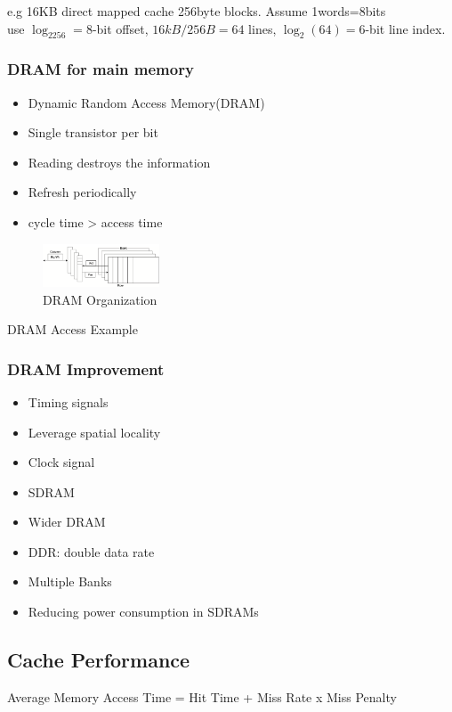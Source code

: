 e.g 16KB direct mapped cache 256byte blocks. Assume 1words=8bits\\
use $\log_2256=8$-bit offset, $16kB/256B=64$ lines, $\log_2(64)=6$-bit line index. 

\subsubsection{DRAM for main memory}
\begin{itemize}
    \item Dynamic Random Access Memory(DRAM)
    \item Single transistor per bit
    \item Reading destroys the information
    \item Refresh periodically
    \item cycle time > access time
\end{itemize}

\begin{figure}[!htb]
    \centering
    \includegraphics[width=0.309\textwidth]{pic/CA2/DRAM Organization}
    \caption{DRAM Organization}
\end{figure}

DRAM Access Example

\subsubsection{DRAM Improvement}
\begin{itemize}
    \item Timing signals
    \item Leverage spatial locality
    \item Clock signal
    \item SDRAM
    \item Wider DRAM
    \item DDR: double data rate
    \item Multiple Banks
    \item Reducing power consumption in SDRAMs
\end{itemize}

\subsection{Cache Performance}
Average Memory Access Time = Hit Time + Miss Rate x Miss Penalty


